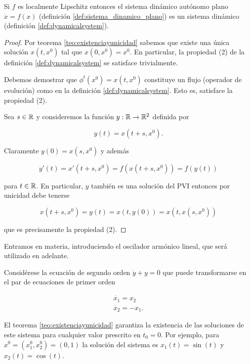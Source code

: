 \begin{proposition}Si $f$ es localmente Lipschitz entonces el sistema dinámico autónomo plano $\dot{x} = f(x)$ (definición \ref{def:sistema_dinamico_plano}) es un sistema dinámico (definición \ref{def:dynamicalsystem}).
\begin{proof}

Por teorema \ref{teo:existenciayunicidad} sabemos que existe una única solución $x(t,x^0)$ tal que $x(0,x^0) = x^0$. En particular, la propiedad (2) de la definición \ref{def:dynamicalsystem} se satisface trivialmente.

Debemos demostrar que $\phi^t(x^0) = x(t,x^0)$ constituye un flujo (operador de evolución) como en la definición \ref{def:dynamicalsystem}. Esto es, satisface la propiedad (2).

Sea $s \in {\ensuremath{\mathbb{R}}}$ y consideremos la función $y: {\mathbb{R}} \to {\ensuremath{\mathbb{R}}}^2$ definida por 

$$ y(t) = x(t+s, x^0).$$

Claramente $y(0) = x(s,x^0)$ y además

$$ y'(t) = x'(t+s,x^0) = f(x(t+s, x^0)) = f(y(t))  $$

para $t \in {\ensuremath{\mathbb{R}}}$. En particular, $y$ también es una solución del PVI entonces por unicidad debe tenerse

$$ x(t+s,x^0) = y(t) = x(t, y(0)) = x(t, x(s,x^0))$$

que es precisamente la propiedad (2).
\end{proof}
\end{proposition}

Entramos en materia, introduciendo el oscilador armónico lineal, que será utilizado en adelante.

\begin{example} \label{ex:osciladorarmonico} Considérese la ecuación de segundo orden $\ddot{y} + y = 0$ que puede transformarse en el par de ecuaciones de primer orden

\begin{equation} \label{eq:osciladorarmonico}
	\begin{array}{l}
		\dot{x_1} = x_2 \\
		\dot{x_2} = -x_1.
	\end{array}
\end{equation}

El teorema \ref{teo:existenciayunicidad} garantiza la existencia de las soluciones de este sistema para cualquier valor prescrito en $t_0 = 0$. Por ejemplo, para $x^0 = (x_1^0,x_2^0) = (0,1)$ la solución del sistema es $x_1(t) = \sin(t)$ y $x_2(t) = \cos(t)$.
\end{example}

